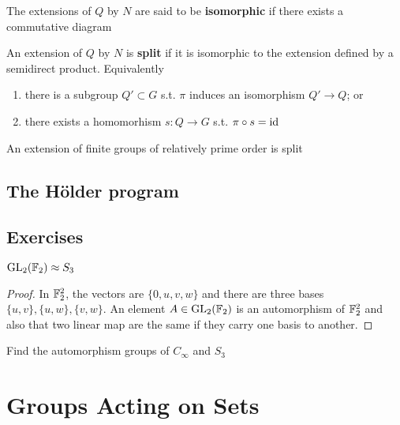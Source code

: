 \documentclass[11pt]{article}
\begin{document}
The extensions of \(Q\) by \(N\) are said to be \textbf{isomorphic} if there exists a commutative diagram
\begin{center}\end{center}
An extension of \(Q\) by \(N\) is \textbf{split} if it is isomorphic to the extension defined by a
semidirect product. Equivalently
\begin{enumerate}
\item there is a subgroup \(Q'\subset G\) s.t. \(\pi\) induces an isomorphism \(Q'\to Q\); or
\item there exists a homomorhism \(s:Q\to G\) s.t. \(\pi\circ s=\operatorname{id}\)
\end{enumerate}


\begin{theorem}
An extension of finite groups of relatively prime order is split
\end{theorem}
\subsection{The Hölder program}
\label{sec:org3bbbd65}

\subsection{Exercises}
\label{sec:org89e7972}
\begin{exercise}
\label{ex3.3}
\(\operatorname{GL}_2(\mathbb{F}_2)\approx S_3\)
\end{exercise}

\begin{proof}
In \(\mathbb{F}_2^2\), the vectors are \(\{0,u,v,w\}\) and there are three bases \(\{u,v\},\{u,w\},\{v,w\}\). An
element \(A\in\operatorname{GL}_2(\mathbb{F}_2)\) is an automorphism of \(\mathbb{F}_2^2\) and also that two linear map are the same
if they carry one basis to another.
\end{proof}

\begin{exercise}
Find the automorphism groups of \(C_\infty\) and \(S_3\)
\end{exercise}

\section{Groups Acting on Sets}
\label{sec:org0fa073d}
\end{document}

